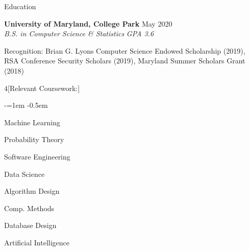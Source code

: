 \documentclass{resume} %
\newenvironment{hanging}{
    \list{}{
        \itemindent=-1em
        \leftmargin=1em
        \topsep=0pt
        \partopsep=0pt
    }
    \item\relax
}{
    \endlist
}
\begin{document}

\begin{rSection}{Education}

{\bf University of Maryland, College Park} \hfill {May 2020} \\
{\em B.S. in Computer Science \& Statistics} \hfill {\em GPA 3.6}

\begin{hanging}
Recognition: {Brian G. Lyons Computer Science Endowed Scholarship (2019)}, {RSA Conference Security Scholars (2019)}, {Maryland Summer Scholars Grant (2018)}
\end{hanging}

\setlength{\multicolsep}{0em} %
\begin{multicols}{4}[Relevant Coursework:] %
    \begin{list}{-}{\leftmargin=1em} %
    \itemsep -0.5em \vspace{-0.5em} %
	\item Machine Learning
	\item Probability Theory
	\item Software Engineering
	\item Data Science
	\item Algorithm Design
	\item Comp. Methods
	\item Database Design
	\item Artificial Intelligence
    \end{list}
\end{multicols}

\end{rSection}

\end{document}

